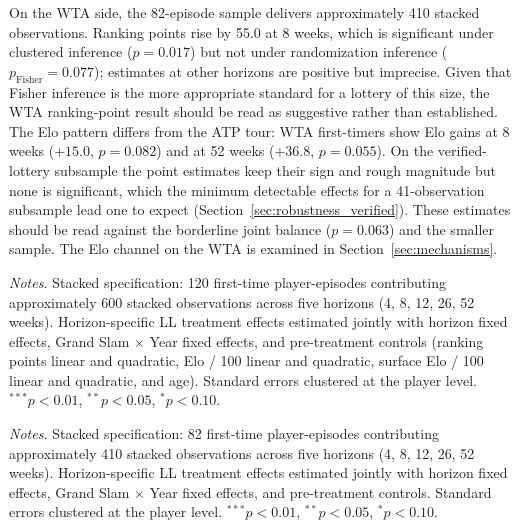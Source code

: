 On the WTA side, the 82-episode sample delivers approximately 410 stacked observations. Ranking points rise by 55.0 at 8 weeks, which is significant under clustered inference ($p = 0.017$) but not under randomization inference ($p_{\text{Fisher}} = 0.077$); estimates at other horizons are positive but imprecise. Given that Fisher inference is the more appropriate standard for a lottery of this size, the WTA ranking-point result should be read as suggestive rather than established. The Elo pattern differs from the ATP tour: WTA first-timers show Elo gains at 8 weeks ($+15.0$, $p = 0.082$) and at 52 weeks ($+36.8$, $p = 0.055$). On the verified-lottery subsample the point estimates keep their sign and rough magnitude but none is significant, which the minimum detectable effects for a 41-observation subsample lead one to expect (Section~\ref{sec:robustness_verified}). These estimates should be read against the borderline joint balance ($p = 0.063$) and the smaller sample. The Elo channel on the WTA is examined in Section~\ref{sec:mechanisms}.

\begin{table}[htbp]
\centering
\caption{ATP Grand Slam: Post-Episode Dynamic Effects (Stacked Model)}
\label{tab:dynamic_atp}
\begin{threeparttable}
\small

\begin{tablenotes}
\footnotesize
\item \textit{Notes.} Stacked specification: 120 first-time player-episodes contributing approximately 600 stacked observations across five horizons (4, 8, 12, 26, 52 weeks). Horizon-specific LL treatment effects estimated jointly with horizon fixed effects, Grand Slam $\times$ Year fixed effects, and pre-treatment controls (ranking points linear and quadratic, Elo / 100 linear and quadratic, surface Elo / 100 linear and quadratic, and age). Standard errors clustered at the player level. $^{***}p<0.01$, $^{**}p<0.05$, $^{*}p<0.10$.
\end{tablenotes}
\end{threeparttable}
\end{table}

\begin{table}[htbp]
\centering
\caption{WTA Grand Slam: Post-Episode Dynamic Effects (Stacked Model)}
\label{tab:dynamic_wta}
\begin{threeparttable}
\small

\begin{tablenotes}
\footnotesize
\item \textit{Notes.} Stacked specification: 82 first-time player-episodes contributing approximately 410 stacked observations across five horizons (4, 8, 12, 26, 52 weeks). Horizon-specific LL treatment effects estimated jointly with horizon fixed effects, Grand Slam $\times$ Year fixed effects, and pre-treatment controls. Standard errors clustered at the player level. $^{***}p<0.01$, $^{**}p<0.05$, $^{*}p<0.10$.
\end{tablenotes}
\end{threeparttable}
\end{table}

